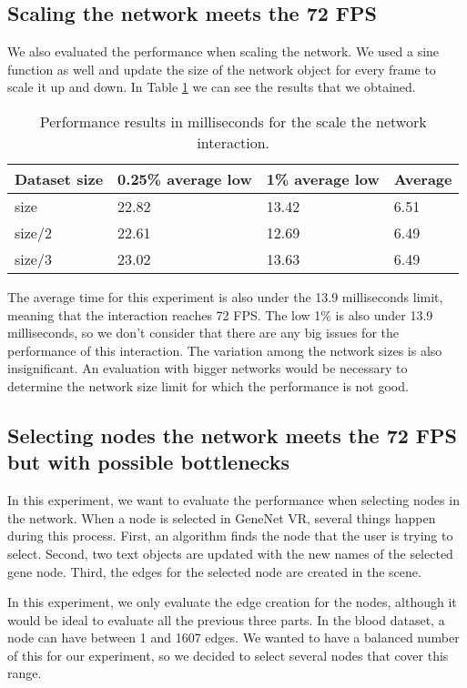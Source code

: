 \subsection{Scaling the network meets the 72 FPS}
We also evaluated the performance when scaling the network. We used a sine function as well and update the size of the network object for every frame to scale it up and down. In Table \ref{tab:experiment_scale} we can see the results that we obtained.

\begin{table}[h!]
\centering
\begin{tabular}{llll}
\hline
Dataset size & 0.25\% average low & 1\% average low & Average \\
\hline
size & 22.82 & 13.42 & 6.51 \\
size/2 & 22.61 & 12.69 & 6.49 \\
size/3 & 23.02 & 13.63 & 6.49 \\
\end{tabular}
\caption{Performance results in milliseconds for the scale the network interaction.}
\label{tab:experiment_scale}
\end{table}

The average time for this experiment is also under the 13.9 milliseconds limit, meaning that the interaction reaches 72 FPS. The low 1\% is also under 13.9 milliseconds, so we don't consider that there are any big issues for the performance of this interaction. The variation among the network sizes is also insignificant. An evaluation with bigger networks would be necessary to determine the network size limit for which the performance is not good.

\subsection{Selecting nodes the network meets the 72 FPS but with possible bottlenecks}
In this experiment, we want to evaluate the performance when selecting nodes in the network. When a node is selected in GeneNet VR, several things happen during this process. First, an algorithm finds the node that the user is trying to select. Second, two text objects are updated with the new names of the selected gene node. Third, the edges for the selected node are created in the scene.

In this experiment, we only evaluate the edge creation for the nodes, although it would be ideal to evaluate all the previous three parts. In the blood dataset, a node can have between 1 and 1607 edges. We wanted to have a balanced number of this for our experiment, so we decided to select several nodes that cover this range.


